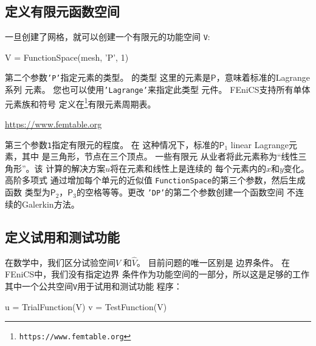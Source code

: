 
\subsection{定义有限元函数空间}

一旦创建了网格，就可以创建一个有限元的功能空间
\texttt{V}:

\begin{python}
V = FunctionSpace(mesh, 'P', 1)
\end{python}

第二个参数\texttt{'P'}指定元素的类型。 的类型
这里的元素是$\mathsf{P}$，意味着标准的Lagrange系列
元素。 您也可以使用\texttt{'Lagrange'}来指定此类型
元件。 FEniCS支持所有单体元素族和符号
定义在\footnote{\texttt{https://www.femtable.org}}{有限元素周期表}\cite{ArnoldLogg2014}。
\begin{center}
  \url{https://www.femtable.org}
\end{center}


第三个参数\texttt{1}指定有限元的程度。 在
这种情况下，标准的$\mathsf{P}_1$ linear Lagrange元素，其中
是三角形，节点在三个顶点。 一些有限元
从业者将此元素称为“线性三角形”。该
计算的解决方案$u$将在元素和线性上是连续的
每个元素内的$x$和$y$变化。 高阶多项式
通过增加每个单元的近似值
\texttt{FunctionSpace}的第三个参数，然后生成函数
类型为$\mathsf{P}_2$，$\mathsf{P}_3$的空格等等。更改
\texttt{'DP'}的第二个参数创建一个函数空间
不连续的Galerkin方法。

 

\subsection{定义试用和测试功能}
在数学中，我们区分试验空间$V$
和$\hat{V}$。 目前问题的唯一区别是
边界条件。 在FEniCS中，我们没有指定边界
条件作为功能空间的一部分，所以这是足够的工作
其中一个公共空间\texttt{V}用于试用和测试功能
程序：
\begin{python}
u = TrialFunction(V)
v = TestFunction(V)
\end{python}



